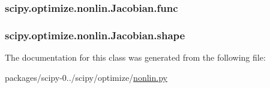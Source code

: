 \subsubsection[{func}]{\setlength{\rightskip}{0pt plus 5cm}scipy.\+optimize.\+nonlin.\+Jacobian.\+func}\label{classscipy_1_1optimize_1_1nonlin_1_1Jacobian_acf4b293f7d8114567d69b61b4cd11b8c}
\hypertarget{classscipy_1_1optimize_1_1nonlin_1_1Jacobian_a399bcc4bdec38649979fb903ec3c509a}{}
\subsubsection[{shape}]{\setlength{\rightskip}{0pt plus 5cm}scipy.\+optimize.\+nonlin.\+Jacobian.\+shape}\label{classscipy_1_1optimize_1_1nonlin_1_1Jacobian_a399bcc4bdec38649979fb903ec3c509a}


The documentation for this class was generated from the following file\+:\begin{DoxyCompactItemize}
\item 
packages/scipy-\/0../scipy/optimize/\hyperlink{nonlin_8py}{nonlin.\+py}\end{DoxyCompactItemize}
